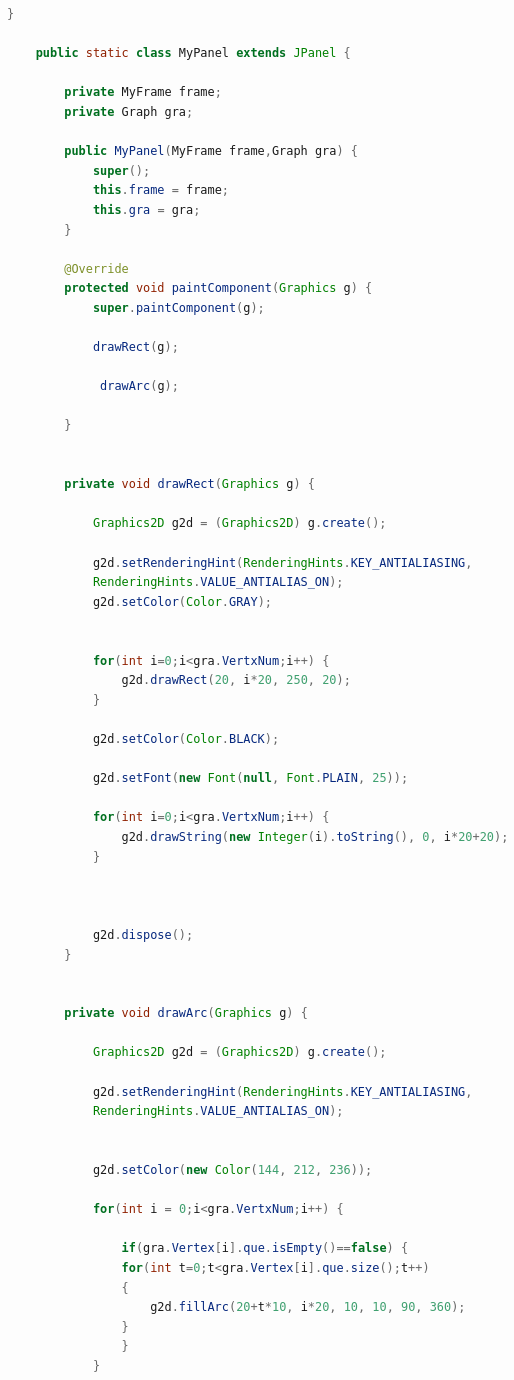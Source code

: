 \documentclass[12pt]{article}
\begin{document}
\begin{subappendices}
\begin{lstlisting}[language=Java, caption=\texttt{Demo program}]
		}

    public static class MyPanel extends JPanel {

        private MyFrame frame;
        private Graph gra;

        public MyPanel(MyFrame frame,Graph gra) {
            super();
            this.frame = frame;
            this.gra = gra;
        }

        @Override
        protected void paintComponent(Graphics g) {
            super.paintComponent(g);

            drawRect(g);

             drawArc(g);

        }


        private void drawRect(Graphics g) {
            
            Graphics2D g2d = (Graphics2D) g.create();

			g2d.setRenderingHint(RenderingHints.KEY_ANTIALIASING, 
			RenderingHints.VALUE_ANTIALIAS_ON);
            g2d.setColor(Color.GRAY);

        
            for(int i=0;i<gra.VertxNum;i++) {
            	g2d.drawRect(20, i*20, 250, 20);
            }
            
            g2d.setColor(Color.BLACK);
            
            g2d.setFont(new Font(null, Font.PLAIN, 25));

            for(int i=0;i<gra.VertxNum;i++) {
            	g2d.drawString(new Integer(i).toString(), 0, i*20+20);
            }
            
           

            g2d.dispose();
        }

       
        private void drawArc(Graphics g) {
            
            Graphics2D g2d = (Graphics2D) g.create();

			g2d.setRenderingHint(RenderingHints.KEY_ANTIALIASING, 
			RenderingHints.VALUE_ANTIALIAS_ON);
            

            g2d.setColor(new Color(144, 212, 236));

            for(int i = 0;i<gra.VertxNum;i++) {
            	
            	if(gra.Vertex[i].que.isEmpty()==false) {
            	for(int t=0;t<gra.Vertex[i].que.size();t++)
            	{
            		g2d.fillArc(20+t*10, i*20, 10, 10, 90, 360);
            	}
            	}
            }


\end{lstlisting}
\end{subappendices}
\end{document}
